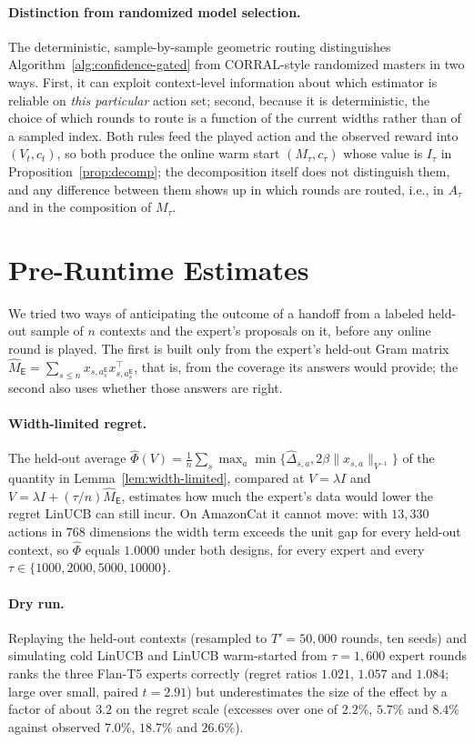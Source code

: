 \documentclass{article}
\theoremstyle{definition}
\theoremstyle{remark}
\theoremstyle{remark}
\newcommand{\Exp}{\mathsf{E}}
\begin{document}
\paragraph{Distinction from randomized model selection.}
The deterministic, sample-by-sample geometric routing distinguishes
Algorithm~\ref{alg:confidence-gated} from CORRAL-style randomized
masters in two ways. First, it can exploit context-level information
about which estimator is reliable on \emph{this particular} action
set; second, because it is deterministic, the choice of which rounds to route
is a function of the current widths rather than of a sampled index. Both
rules feed the played action and the observed reward into $(V_t,c_t)$, so
both produce the online warm start $(M_\tau,c_\tau)$ whose value is
$I_\tau$ in Proposition~\ref{prop:decomp}; the decomposition itself does not
distinguish them, and any difference between them shows up in which rounds
are routed, i.e., in $A_\tau$ and in the composition of $M_\tau$.


\section{Pre-Runtime Estimates}
\label{app:diagnostics}

We tried two ways of anticipating the outcome of a handoff from a labeled
held-out sample of $n$ contexts and the expert's proposals on it, before any
online round is played. The first is built only from the expert's held-out
Gram matrix
$\widehat M_{\Exp}=\sum_{s\le n}x_{s,a_s^{\Exp}}x_{s,a_s^{\Exp}}^\top$, that is,
from the coverage its answers would provide; the second also uses whether
those answers are right.

\paragraph{Width-limited regret.} The held-out average
$\widehat\Phi(V)=\frac1n\sum_s\max_a\min\{\widehat\Delta_{s,a},2\beta\|x_{s,a}\|_{V^{-1}}\}$
of the quantity in Lemma~\ref{lem:width-limited}, compared at
$V=\lambda I$ and $V=\lambda I+(\tau/n)\widehat M_{\Exp}$, estimates how much
the expert's data would lower the regret LinUCB can still incur. On AmazonCat
it cannot move: with $13{,}330$ actions in $768$ dimensions the width term
exceeds the unit gap for every held-out context, so $\widehat\Phi$ equals
$1.0000$ under both designs, for every expert and every
$\tau\in\{1000,2000,5000,10000\}$.

\paragraph{Dry run.} Replaying the held-out contexts (resampled to
$T'=50{,}000$ rounds, ten seeds) and simulating cold LinUCB and LinUCB
warm-started from $\tau=1{,}600$ expert rounds ranks the three Flan-T5 experts
correctly (regret ratios $1.021$, $1.057$ and $1.084$; large over small,
paired $t=2.91$) but underestimates the size of the effect by a factor of
about $3.2$ on the regret scale (excesses over one of $2.2\%$, $5.7\%$ and
$8.4\%$ against observed $7.0\%$, $18.7\%$ and $26.6\%$).
\end{document}
